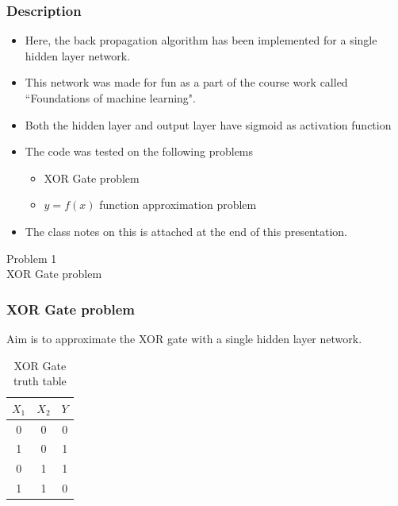 
\begin{frame}
    \frametitle{Description}
    \begin{itemize}
        \item Here, the back propagation algorithm has been implemented for
            a single hidden layer network.
        \item This network was made for fun as a part of the course work called
            ``Foundations of machine learning".
        \item Both the hidden layer and output layer have sigmoid as activation
            function
        \item The code was tested on the following problems
            \begin{itemize}
                \item XOR Gate problem
                \item $y=f(x)$ function approximation problem
            \end{itemize}
        \item The class notes on this is attached at the end of this presentation.
    \end{itemize}
\end{frame}

\begin{frame}
    \centering
     Problem 1 \\ \vspace{1cm} XOR Gate problem
\end{frame}

\begin{frame}
    \frametitle{XOR Gate problem}
    Aim is to approximate the XOR gate with a single hidden layer network.
    \begin{table}
        \caption{XOR Gate truth table}
        \begin{tabular}{ccc}
        \toprule
            \(X_1\) & \(X_2\) & \(Y\) \\ \midrule
            0 & 0 & 0 \\
            1 & 0 & 1 \\
            0 & 1 & 1 \\
            1 & 1 & 0 \\ \bottomrule
        \end{tabular}
    \end{table}
\end{frame}

